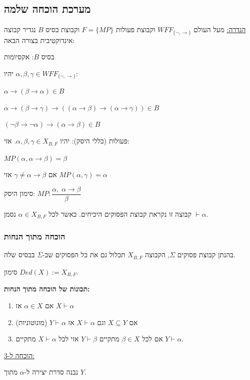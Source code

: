 \documentclass[12pt,a4paper]{article}
\begin{document}
\subsection*{מערכת הוכחה שלמה}

\underline{הגדרה:} מעל העולם $WFF_{\{\lnot,\rightarrow\}}$ וקבוצת פעולות $F=\{MP\}$ וקבוצת בסיס $B$ נגדיר קבוצה אינדוקטיבית בצורה הבאה:

בסיס $B$: אקסיומות

יהיו $\alpha,\beta,\gamma\in WFF_{\{\lnot,\rightarrow\}}$:

$\alpha\rightarrow(\beta\rightarrow\alpha)\in B$

$\alpha\rightarrow(\beta\rightarrow\gamma)\rightarrow((\alpha\rightarrow\beta)\rightarrow(\alpha\rightarrow\gamma))\in B$

$(\lnot\beta\rightarrow\lnot\alpha)\rightarrow(\alpha\rightarrow\beta)\in B$

פעולות (כללי היסק): יהיו $\alpha,\beta,\gamma\in X_{B,F}$. אזי:

$MP(\alpha,\alpha\rightarrow\beta)=\beta$

אם $\gamma\neq\alpha\rightarrow\beta$ אזי $MP(\alpha,\gamma)=\alpha$

סימון היסק: $MP:\dfrac{\alpha,\;\alpha\rightarrow\beta}{\beta}$

קבוצה זו נקראת קבוצת הפסוקים היכיחים. כאשר לכל $\alpha\in X_{B,F}$ נסמן $\vdash\alpha$.

\subsubsection*{הוכחה מתוך הנחות}

בהנתן קבוצת פסוקים $\Sigma$, הקבוצה $X_{B,F}$ תכלול גם את כל הפסוקים שב-$\Sigma$ בבסיס שלה.

סימון $Ded(X):=X_{B,F}$.

\textbf{תכונות של הוכחה מתוך הנחות:}

\begin{enumerate}
  \item אם $\alpha\in X$ אז $X\vdash\alpha$
  \item אם $X\subseteq Y$ וגם $X\vdash\alpha$ אז $Y\vdash\alpha$ (מונוטוניות)
  \item אם לכל $\beta\in X$ מתקיים $Y\vdash\beta$ אזי לכל $X\vdash\alpha$ מתקיים $Y\vdash\alpha$.
\end{enumerate}

\underline{הוכחה ל-3:}

נבנה סדרת יצירה ל-$\alpha$ מתוך $Y$.
\end{document}
